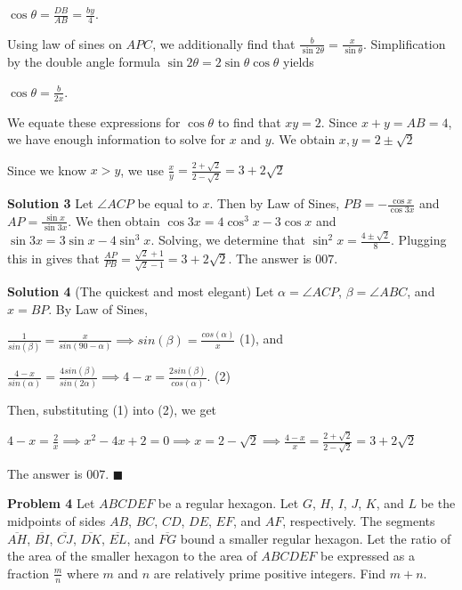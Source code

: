 \documentclass[a4paper,11pt]{article}
\begin{document}
$\cos\theta=\frac{DB}{AB}=\frac{by}{4}$.


Using law of sines on $APC$, we additionally find that $\frac{b}{\sin 2\theta}=\frac{x}{\sin\theta}.$ Simplification by the double angle formula $\sin 2\theta=2\sin \theta\cos\theta$ yields

$\cos \theta=\frac{b}{2x}$.


We equate these expressions for $\cos\theta$ to find that $xy=2$. Since $x+y=AB=4$, we have enough information to solve for $x$ and $y$. We obtain  $x,y=2 \pm \sqrt{2}$

Since we know $x>y$, we use $\frac{x}{y}=\frac{2+\sqrt{2}}{2-\sqrt{2}}=3+2\sqrt{2}$

\textbf{Solution 3}
Let $\angle{ACP}$ be equal to $x$. Then by Law of Sines, $PB = -\frac{\cos{x}}{\cos{3x}}$ and $AP = \frac{\sin{x}}{\sin{3x}}$. We then obtain $\cos{3x} = 4\cos^3{x} - 3\cos{x}$ and $\sin{3x} = 3\sin{x} - 4\sin^3{x}$. Solving, we determine that $\sin^2{x} = \frac{4 \pm \sqrt{2}}{8}$. Plugging this in gives that $\frac{AP}{PB} = \frac{\sqrt{2}+1}{\sqrt{2}-1} = 3 + 2\sqrt{2}$. The answer is $\boxed{007}$.

\textbf{Solution 4} (The quickest and most elegant)
Let $\alpha=\angle{ACP}$, $\beta=\angle{ABC}$, and $x=BP$. By Law of Sines,

$\frac{1}{sin(\beta)}=\frac{x}{sin(90-\alpha)}\implies sin(\beta)=\frac{cos(\alpha)}{x}$ (1), and

$\frac{4-x}{sin(\alpha)}=\frac{4sin(\beta)}{sin(2\alpha)} \implies 4-x=\frac{2sin(\beta)}{cos(\alpha)}$. (2)

Then, substituting (1) into (2), we get

$4-x=\frac{2}{x} \implies x^2-4x+2=0 \implies x=2-\sqrt{2} \implies \frac{4-x}{x}=\frac{2+\sqrt{2}}{2-\sqrt{2}}=3+2\sqrt{2}$

The answer is $\boxed{007}$.  \hfill $\blacksquare$
 
\textbf{ Problem 4}
Let $ABCDEF$ be a regular hexagon. Let $G$, $H$, $I$, $J$, $K$, and $L$ be the midpoints of sides $AB$, $BC$, $CD$, $DE$, $EF$, and $AF$, respectively. The segments $\overline{AH}$, $\overline{BI}$, $\overline{CJ}$, $\overline{DK}$, $\overline{EL}$, and $\overline{FG}$ bound a smaller regular hexagon. Let the ratio of the area of the smaller hexagon to the area of $ABCDEF$ be expressed as a fraction $\frac {m}{n}$ where $m$ and $n$ are relatively prime positive integers. Find $m + n$.
\end{document}

